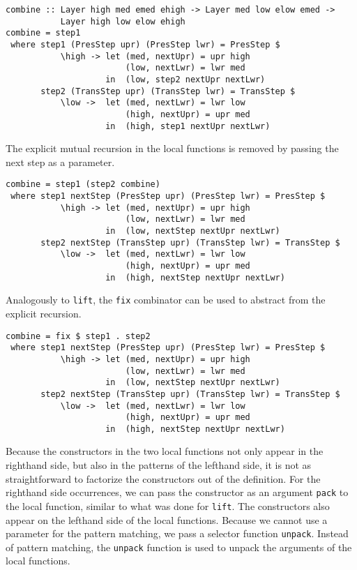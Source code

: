 \begin{small}
\begin{verbatim}
combine :: Layer high med emed ehigh -> Layer med low elow emed -> 
           Layer high low elow ehigh
combine = step1
 where step1 (PresStep upr) (PresStep lwr) = PresStep $
           \high -> let (med, nextUpr) = upr high
                        (low, nextLwr) = lwr med
                    in  (low, step2 nextUpr nextLwr)
       step2 (TransStep upr) (TransStep lwr) = TransStep $
           \low ->  let (med, nextLwr) = lwr low
                        (high, nextUpr) = upr med
                    in  (high, step1 nextUpr nextLwr)
\end{verbatim}
\end{small}

The explicit mutual recursion in the local functions is removed by passing the next step as a parameter.

\begin{small}
\begin{verbatim}
combine = step1 (step2 combine)
 where step1 nextStep (PresStep upr) (PresStep lwr) = PresStep $
           \high -> let (med, nextUpr) = upr high
                        (low, nextLwr) = lwr med
                    in  (low, nextStep nextUpr nextLwr)
       step2 nextStep (TransStep upr) (TransStep lwr) = TransStep $
           \low ->  let (med, nextLwr) = lwr low
                        (high, nextUpr) = upr med
                    in  (high, nextStep nextUpr nextLwr)
\end{verbatim}
\end{small}

Analogously to \texttt{lift}, the \texttt{fix} combinator can be used to abstract from the explicit recursion.

\begin{small}
\begin{verbatim}
combine = fix $ step1 . step2
 where step1 nextStep (PresStep upr) (PresStep lwr) = PresStep $
           \high -> let (med, nextUpr) = upr high
                        (low, nextLwr) = lwr med
                    in  (low, nextStep nextUpr nextLwr)
       step2 nextStep (TransStep upr) (TransStep lwr) = TransStep $
           \low ->  let (med, nextLwr) = lwr low
                        (high, nextUpr) = upr med
                    in  (high, nextStep nextUpr nextLwr)
\end{verbatim}
\end{small}

Because the constructors in the two local functions not only appear in the righthand side, but also in the patterns of the lefthand side, it is not as straightforward to factorize the constructors out of the definition. For the righthand side occurrences, we can pass the constructor as an argument \texttt{pack} to the local function, similar to what was done for \texttt{lift}. The constructors also appear on the lefthand side of the local functions. Because we cannot use a parameter for the pattern matching, we pass a selector function \texttt{unpack}. Instead of pattern matching, the \texttt{unpack} function is used to unpack the arguments of the local functions.

